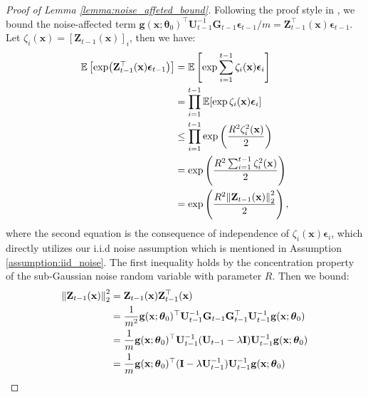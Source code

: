 \begin{proof}[Proof of Lemma \ref{lemma:noise_affeted_bound}]
Following the proof style in \citet{vakili2021optimal}, we bound the noise-affected term $\mathbf{g}(\mathbf{x}; \boldsymbol{\theta}_0)^\top \mathbf{U}^{-1}_{t-1} \mathbf{G}_{t-1} \boldsymbol{\epsilon}_{t-1}/m = \mathbf{Z}_{t-1}^\top (\mathbf{x})\boldsymbol{\epsilon}_{t-1}$. Let $\zeta_i(\mathbf{x}) = [\mathbf{Z}_{t-1}(\mathbf{x})]_i$, then we have: 
\begin{equation}
\begin{split}
    \mathbb E \left[\exp ( \mathbf{Z}_{t-1}^\top(\mathbf{x})\boldsymbol{\epsilon}_{t-1} ) \right] & =  \mathbb{E}\left[ \exp \sum_{i=1}^{t-1} \zeta_i(\mathbf{x}) \boldsymbol{\epsilon}_i  \right] \\
    & = \prod_{i=1}^{t-1} \mathbb{E} [\exp \zeta_i(\mathbf{x}) \boldsymbol{\epsilon}_i] \\
    &  \leq \prod_{i=1}^{t-1} \exp \left( \frac{R^2 \zeta_i^2(\mathbf{x})}{2} \right)\\
    &  = \exp \left (\frac{R^2 \sum_{i=1}^{t-1}\zeta_i^2(\mathbf{x})}{2} \right) \\
     & = \mathbb \exp \left( \frac{R^2\norm{\mathbf{Z}_{t-1}(\mathbf{x})}^2_2}{2} \right), \\
\end{split}
\label{eqn:noise_effect}
\end{equation}
where the second equation is the consequence of independence of $\zeta_i(\mathbf{x})\boldsymbol{\epsilon}_i$, which directly utilizes our i.i.d noise assumption which is mentioned in Assumption \ref{assumption:iid_noise}. The first inequality holds by the concentration property of the sub-Gaussian noise random variable with parameter $R$. Then we bound:  
\begin{equation}
\label{eqn:bound_Z}
\begin{split}
        \norm{\mathbf{Z}_{t-1}(\mathbf{x})}^2_2 & = \mathbf{Z}_{t-1}(\mathbf{x}) \mathbf{Z}_{t-1}^\top(\mathbf{x})\\
        & = \frac{1}{m^2} \mathbf{g}(\mathbf{x}; \boldsymbol{\theta}_0)^\top \mathbf{U}^{-1}_{t-1} \mathbf{G}_{t-1} \mathbf{G}_{t-1}^\top \mathbf{U}^{-1}_{t-1}\mathbf{g}(\mathbf{x}; \boldsymbol{\theta}_0)
        \\
        & = \frac{1}{m} \mathbf{g}(\mathbf{x}; \boldsymbol{\theta}_0)^\top \mathbf{U}^{-1}_{t-1} (\mathbf{U}_{t-1} - \lambda\mathbf{I}) \mathbf{U}^{-1}_{t-1}\mathbf{g}(\mathbf{x}; \boldsymbol{\theta}_0) \\
        & = \frac{1}{m}\mathbf{g}(\mathbf{x}; \boldsymbol{\theta}_0)^\top  (\mathbf{I} - \lambda\mathbf{U}^{-1}_{t-1}) \mathbf{U}^{-1}_{t-1} \mathbf{g}(\mathbf{x}; \boldsymbol{\theta}_0)\\

\end{split}
\end{equation}
\end{proof}
